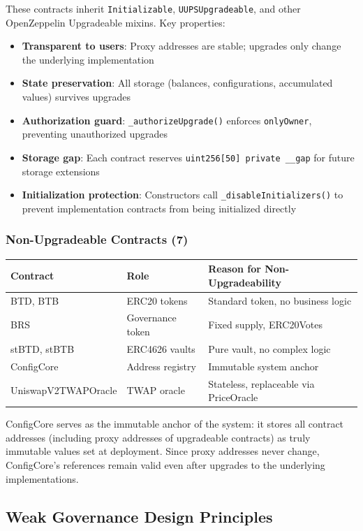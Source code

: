 \documentclass{article}
\begin{document}
These contracts inherit \texttt{Initializable}, \texttt{UUPSUpgradeable}, and other OpenZeppelin Upgradeable mixins. Key properties:
\begin{itemize}
  \item \textbf{Transparent to users}: Proxy addresses are stable; upgrades only change the underlying implementation
  \item \textbf{State preservation}: All storage (balances, configurations, accumulated values) survives upgrades
  \item \textbf{Authorization guard}: \texttt{\_authorizeUpgrade()} enforces \texttt{onlyOwner}, preventing unauthorized upgrades
  \item \textbf{Storage gap}: Each contract reserves \texttt{uint256[50] private \_\_gap} for future storage extensions
  \item \textbf{Initialization protection}: Constructors call \texttt{\_disableInitializers()} to prevent implementation contracts from being initialized directly
\end{itemize}

\subsubsection{Non-Upgradeable Contracts (7)}
\begin{center}
\begin{tabular}{lll}
\toprule
Contract & Role & Reason for Non-Upgradeability \\
\midrule
BTD, BTB & ERC20 tokens & Standard token, no business logic \\
BRS & Governance token & Fixed supply, ERC20Votes \\
stBTD, stBTB & ERC4626 vaults & Pure vault, no complex logic \\
ConfigCore & Address registry & Immutable system anchor \\
UniswapV2TWAPOracle & TWAP oracle & Stateless, replaceable via PriceOracle \\
\bottomrule
\end{tabular}
\end{center}

ConfigCore serves as the immutable anchor of the system: it stores all contract addresses (including proxy addresses of upgradeable contracts) as truly immutable values set at deployment. Since proxy addresses never change, ConfigCore's references remain valid even after upgrades to the underlying implementations.

\subsection{Weak Governance Design Principles}
\end{document}
